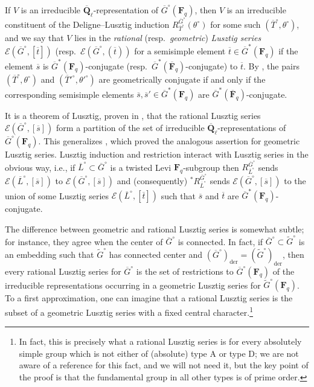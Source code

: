 \documentclass[reqno]{amsart}
\numberwithin{equation}{subsection}
\newcommand{\F}{\mathbf{F}}
\newcommand{\wt}[1]{\widetilde{#1}}
\newcommand{\Q}{\mathbf{Q}}
\newcommand{\ol}[1]{\overline{#1}}
\newcommand\cE{\mathcal{E}}
\DeclareMathOperator{\der}{der}
\theoremstyle{remark}
\numberwithin{equation}{subsection}
\numberwithin{figure}{subsection}
\begin{document}
If $V$ is an irreducible $\ol\Q_\ell$-representation of $\ol G^\circ(\F_q)$, then $V$ is an irreducible constituent of the Deligne--Lusztig induction $R_{\ol T^\circ}^{\ol G^\circ}(\theta^\circ)$ for some such $(\ol T^\circ, \theta^\circ)$, and we say that $V$ lies in the \textit{rational} (resp.\ \textit{geometric}) \textit{Lusztig series} $\cE(\ol G^\circ, [\ol t])$ (resp.\ $\cE(\ol G^\circ, (\ol t))$ for a semisimple element $\ol t \in \ol G^*(\F_q)$ if the element $\ol s$ is $\ol G^*(\F_q)$-conjugate (resp.\ $\ol G^*(\ol\F_q)$-conjugate) to $\ol t$. By \cite[Proposition~5.22]{DL76}, the pairs $(\ol T^\circ, \theta^\circ)$ and $(\ol T'^\circ, \theta'^\circ)$ are geometrically conjugate if and only if the corresponding semisimple elements $\ol s, \ol s' \in \ol G^*(\F_q)$ are $\ol G^*(\ol\F_q)$-conjugate.

It is a theorem of Lusztig, proven in \cite[Th\'eor\`eme 11.8(b)]{Bon06}, that the rational Lusztig series $\cE(\ol G^\circ, [\ol s])$ form a partition of the set of irreducible $\ol\Q_\ell$-representations of $\ol G^\circ(\F_q)$. This generalizes \cite[Th\'eor\`eme 6.2]{DL76}, which proved the analogous assertion for geometric Lusztig series. Lusztig induction and restriction interact with Lusztig series in the obvious way, i.e., if $\ol L^\circ \subset \ol G^\circ$ is a twisted Levi $\F_q$-subgroup then $R_{\ol L^\circ}^{\ol G^\circ}$ sends $\cE(\ol L^\circ, [\ol s])$ to $\cE(\ol G^\circ, [\ol s])$ \cite[Th\'eor\`eme 11.10]{Bon06} and (consequently) $^*R_{\ol L^\circ}^{\ol G^\circ}$ sends $\cE(\ol G^\circ, [\ol s])$ to the union of some Lusztig series $\cE(\ol L^\circ, [\ol t])$ such that $\ol s$ and $\ol t$ are $\ol G^*(\F_q)$-conjugate.

The difference between geometric and rational Lusztig series is somewhat subtle; for instance, they agree when the center of $\ol G^\circ$ is connected. In fact, if $\ol G^\circ \subset \wt G^\circ$ is an embedding such that $\wt G^\circ$ has connected center and $(\ol G^\circ)_{\der} = (\wt G^\circ)_{\der}$, then every rational Lusztig series for $\ol G^\circ$ is the set of restrictions to $\ol G^\circ(\F_q)$ of the irreducible representations occurring in a geometric Lusztig series for $\wt G^\circ(\F_q)$. To a first approximation, one can imagine that a rational Lusztig series is the subset of a geometric Lusztig series with a fixed central character.\footnote{In fact, this is precisely what a rational Lusztig series is for every absolutely simple group which is not either of (absolute) type A or type D; we are not aware of a reference for this fact, and we will not need it, but the key point of the proof is that the fundamental group in all other types is of prime order.}
\end{document}
